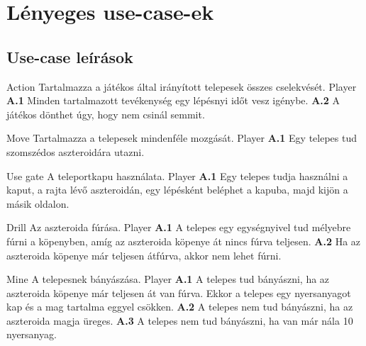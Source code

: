 \documentclass[../../projlab]{subfiles}
\begin{document}
\section{Lényeges use-case-ek}
\subsection{Use-case leírások}

\begin{use-case}
	{Action}
	{Tartalmazza a játékos által irányított telepesek összes cselekvését.}
	{Player}
    \textbf{A.1} Minden tartalmazott tevékenység egy lépésnyi időt vesz igénybe. \newline
	\textbf{A.2} A játékos dönthet úgy, hogy nem csinál semmit.
\end{use-case}

\begin{use-case}
	{Move}
	{Tartalmazza a telepesek mindenféle mozgását.}
	{Player}
    \textbf{A.1} Egy telepes tud szomszédos aszteroidára utazni.
\end{use-case}

\begin{use-case}
	{Use gate}
	{A teleportkapu használata.}
	{Player}
    \textbf{A.1} Egy telepes tudja használni a kaput, a rajta lévő aszteroidán, egy lépésként beléphet a kapuba, majd kijön a másik oldalon.  
\end{use-case}

\begin{use-case}
	{Drill}
	{Az aszteroida fúrása.}
	{Player}
    \textbf{A.1} A telepes egy egységnyivel tud mélyebre fúrni a köpenyben, amíg az aszteroida köpenye át nincs fúrva teljesen.
	\newline
	\textbf{A.2} Ha az aszteroida köpenye már teljesen átfúrva, akkor nem lehet fúrni.
\end{use-case}

\begin{use-case}
	{Mine}
	{A telepesnek bányászása.}
	{Player}
    \textbf{A.1} A telepes tud bányászni, ha az aszteroida köpenye már teljesen át van fúrva. Ekkor a telepes egy nyersanyagot kap és a mag tartalma eggyel csökken.
	\newline
	\textbf{A.2} A telepes nem tud bányászni, ha az aszteroida magja üreges.
	\newline
	\textbf{A.3} A telepes nem tud bányászni, ha van már nála 10 nyersanyag.
\end{use-case}
\end{document}
